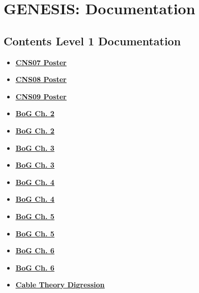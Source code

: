 \documentclass[12pt]{article}
\begin{document}
\section*{GENESIS: Documentation}

\subsection*{Contents Level 1 Documentation}

\begin{itemize}

\item \href{../CNS07/CNS07.pdf}{\bf \underline{CNS07 Poster}}

\item \href{../CNS08/CNS08.pdf}{\bf \underline{CNS08 Poster}}

\item \href{../CNS09/CNS09.pdf}{\bf \underline{CNS09 Poster}}

\item \href{../bog-ch2/bog-ch2.pdf}{\bf \underline{BoG Ch. 2}}

\item \href{../bog-ch2/bog-ch2.pdf}{\bf \underline{BoG Ch. 2}}

\item \href{../bog-ch3/bog-ch3.pdf}{\bf \underline{BoG Ch. 3}}

\item \href{../bog-ch3/bog-ch3.pdf}{\bf \underline{BoG Ch. 3}}

\item \href{../bog-ch4/bog-ch4.pdf}{\bf \underline{BoG Ch. 4}}

\item \href{../bog-ch4/bog-ch4.pdf}{\bf \underline{BoG Ch. 4}}

\item \href{../bog-ch5/bog-ch5.pdf}{\bf \underline{BoG Ch. 5}}

\item \href{../bog-ch5/bog-ch5.pdf}{\bf \underline{BoG Ch. 5}}

\item \href{../bog-ch6/bog-ch6.pdf}{\bf \underline{BoG Ch. 6}}

\item \href{../bog-ch6/bog-ch6.pdf}{\bf \underline{BoG Ch. 6}}

\item \href{../cable-theory-digression/cable-theory-digression.pdf}{\bf \underline{Cable Theory Digression}}


\end{itemize}
\end{document}

